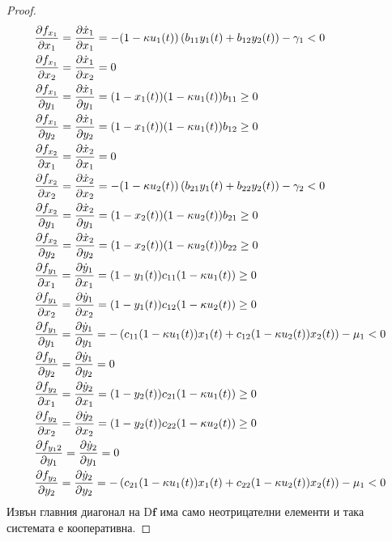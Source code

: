 \begin{proof}
  \label{eq:JacobianElements}
  \begin{equation}
    \begin{split}
      &\pdv{f_{x_1}}{x_1} = \pdv{\dot{x}_1}{x_1} = -(1-\kappa u_1(t)) \left(b_{11} y_1(t) + b_{12} y_2(t)\right) - \gamma_1 < 0 \\
      &\pdv{f_{x_1}}{x_2} = \pdv{\dot{x}_1}{x_2} = 0 \\
      &\pdv{f_{x_1}}{y_1} = \pdv{\dot{x}_1}{y_1} = (1-x_1(t)) (1-\kappa u_1(t)) b_{11} \geq 0 \\
      &\pdv{f_{x_1}}{y_2} = \pdv{\dot{x}_1}{y_2} = (1-x_1(t)) (1-\kappa u_1(t)) b_{12} \geq 0 \\
      &\pdv{f_{x_2}}{x_1} = \pdv{\dot{x}_2}{x_1} = 0 \\
      &\pdv{f_{x_2}}{x_2} = \pdv{\dot{x}_2}{x_2} = -(1-\kappa u_2(t)) \left(b_{21} y_1(t) + b_{22} y_2(t)\right) - \gamma_2 < 0 \\
      &\pdv{f_{x_2}}{y_1} = \pdv{\dot{x}_2}{y_1} = (1-x_2(t)) (1-\kappa u_2(t)) b_{21} \geq 0 \\
      &\pdv{f_{x_2}}{y_2} = \pdv{\dot{x}_2}{y_2} = (1-x_2(t)) (1-\kappa u_2(t)) b_{22} \geq 0 \\
      &\pdv{f_{y_1}}{x_1} = \pdv{\dot{y}_1}{x_1} = (1-y_1(t)) c_{11}(1-\kappa u_1(t)) \geq 0 \\
      &\pdv{f_{y_1}}{x_2} = \pdv{\dot{y}_1}{x_2} = (1-y_1(t)) c_{12}(1-\kappa u_2(t)) \geq 0 \\
      &\pdv{f_{y_1}}{y_1} = \pdv{\dot{y}_1}{y_1} = -\left(c_{11}(1-\kappa u_1(t)) x_1(t) + c_{12}(1-\kappa u_2(t)) x_2(t)\right) - \mu_1 < 0 \\
      &\pdv{f_{y_1}}{y_2} = \pdv{\dot{y}_1}{y_2} = 0 \\
      &\pdv{f_{y_2}}{x_1} = \pdv{\dot{y}_2}{x_1} = (1-y_2(t)) c_{21}(1-\kappa u_1(t)) \geq 0 \\
      &\pdv{f_{y_2}}{x_2} = \pdv{\dot{y}_2}{x_2} = (1-y_2(t)) c_{22}(1-\kappa u_2(t)) \geq 0 \\
      &\pdv{f_{y_12}}{y_1} = \pdv{\dot{y}_2}{y_1} = 0 \\
      &\pdv{f_{y_2}}{y_2} = \pdv{\dot{y}_2}{y_2} = -\left(c_{21}(1-\kappa u_1(t)) x_1(t) + c_{22}(1-\kappa u_2(t)) x_2(t)\right) - \mu_1 < 0
    \end{split}
    \end{equation}
  Извън главния диагонал на $\mathrm{D} \mathbf{f}$ има само неотрицателни елементи и така системата е кооперативна.
\end{proof}


